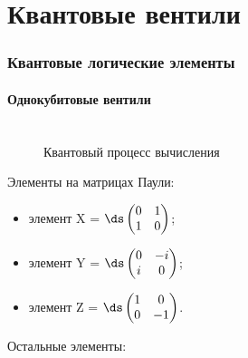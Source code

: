\documentclass[12pt,pdf]{beamer}
\renewcommand{\~}[1]{\widetilde{#1}}
\begin{document}
  \section{Квантовые вентили}
  \begin{frame}
    \frametitle{Квантовые логические элементы}
    \framesubtitle{Однокубитовые вентили}
    \small
    \begin{figure}[h!]
      \center
       \\
      Квантовый процесс вычисления
    \end{figure}
    \vspace{1.5ex}
    \begin{minipage}{.49\textwidth}
      Элементы на матрицах Паули:
      \vspace{-1.5ex}
      \begin{itemize}
        \item элемент X = 
        \( \ds
          \begin{pmatrix}
            0 & 1 \\ 1 & 0
          \end{pmatrix}
        \);
        \item элемент Y = 
        \( \ds
          \begin{pmatrix}
            0 & -i \\ i & 0
          \end{pmatrix}
        \);
        \item элемент Z = 
        \( \ds
          \begin{pmatrix}
            1 & 0 \\ 0 & -1
          \end{pmatrix}
        \).
      \end{itemize}
    \end{minipage}
    \hfill
    \begin{minipage}{.49\textwidth}
      Остальные элементы:
      \vspace{1ex}
\end{minipage}
\end{frame}
\end{document}
